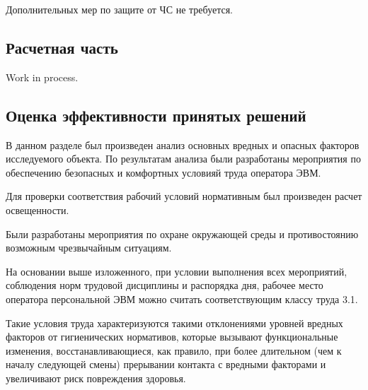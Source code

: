 Дополнительных мер по защите от ЧС не требуется.

\subsection{Расчетная часть}

Work in process.

\subsection{Оценка эффективности принятых решений}

В данном разделе был произведен анализ основных вредных и опасных факторов исследуемого объекта.
По результатам анализа были разработаны мероприятия по обеспечению безопасных и комфортных условияй труда оператора ЭВМ.

Для проверки соответствия рабочий условий нормативным был произведен расчет освещенности.

Были разработаны мероприятия по охране окружающей среды и противостоянию возможным чрезвычайным ситуациям.

На основании выше изложенного, при условии выполнения всех мероприятий, соблюдения норм трудовой дисциплины и распорядка дня, рабочее место оператора персональной ЭВМ можно считать соответствующим классу труда 3.1.

Такие условия труда характеризуются такими отклонениями уровней вредных факторов от гигиенических нормативов, которые вызывают функциональные изменения, восстанавливающиеся, как правило, при более длительном (чем к началу следующей смены) прерывании контакта с вредными факторами и увеличивают риск повреждения здоровья.

\clearpage
\newpage